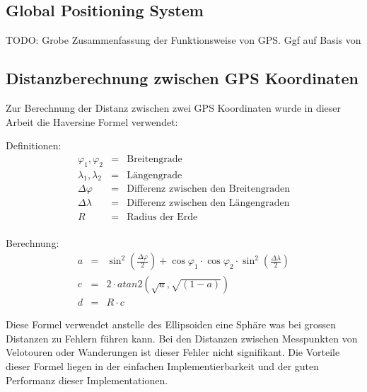 \subsection{Global Positioning System}
TODO: Grobe Zusammenfassung der Funktionsweise von GPS. Ggf auf Basis von \cite{leicagps}

\subsection{Distanzberechnung zwischen GPS Koordinaten}
Zur Berechnung der Distanz zwischen zwei GPS Koordinaten wurde in dieser Arbeit die Haversine Formel verwendet: \cite{haversine} 

Definitionen:\\
\begin{equation}
\begin{array}{lcl}
\varphi_1, \varphi_2 & = & \text{Breitengrade}\\
\lambda_1, \lambda_2 & = & \text{Längengrade}\\
\Delta\varphi & = & \text{Differenz zwischen den Breitengraden}\\
\Delta\lambda & = & \text{Differenz zwischen den Längengraden}\\
R & = & \text{Radius der Erde}\\
\end{array}
\end{equation}

Berechnung:\\
\begin{equation}
\begin{array}{lcl}
a & = &\sin^2(\frac{\Delta\varphi}{2})+\cos \varphi_1 \cdot \cos \varphi_2 \cdot \sin^2(\frac{\Delta\lambda}{2})\\
c & = & 2 \cdot atan2(\sqrt{a}, \sqrt{(1-a)})\\
d & = & R \cdot c
\end{array}
\end{equation}

Diese Formel verwendet anstelle des Ellipsoiden eine Sphäre was bei grossen Distanzen zu Fehlern führen kann. Bei den Distanzen zwischen Messpunkten von Velotouren oder Wanderungen ist dieser Fehler nicht signifikant. Die Vorteile dieser Formel liegen in der einfachen Implementierbarkeit und der guten Performanz dieser Implementationen. 

